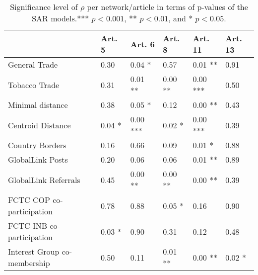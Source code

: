 \begin{table}[ht]
\centering
\begin{tabular}{llllll}
  \toprule
 & Art. 5 & Art. 6 & Art. 8 & Art. 11 & Art. 13 \\ 
  \midrule
General Trade & 0.30   & 0.04 * & 0.57   & 0.01 ** & 0.91   \\ 
  Tobacco Trade & 0.31   & 0.01 ** & 0.00 ** & 0.00 *** & 0.50   \\ 
  Minimal distance & 0.38   & 0.05 * & 0.12   & 0.00 ** & 0.43   \\ 
  Centroid Distance & 0.04 * & 0.00 *** & 0.02 * & 0.00 *** & 0.39   \\ 
  Country Borders & 0.16   & 0.66   & 0.09   & 0.01 * & 0.88   \\ 
  GlobalLink Posts & 0.20   & 0.06   & 0.06   & 0.01 ** & 0.89   \\ 
  GlobalLink Referrals & 0.45   & 0.00 ** & 0.00 ** & 0.00 ** & 0.39   \\ 
  FCTC COP co-participation & 0.78   & 0.88   & 0.05 * & 0.16   & 0.90   \\ 
  FCTC INB co-participation & 0.03 * & 0.90   & 0.31   & 0.12   & 0.48   \\ 
   Interest Group co-membership & 0.50   & 0.11   & 0.01 ** & 0.00 ** & 0.02 * \\ 
   \bottomrule
\end{tabular}
\caption{Significance level of $\rho$ per network/article in terms of p-values of the SAR models.*** $p < 0.001$, ** $p < 0.01$, and * $p < 0.05$.} 
\end{table}

